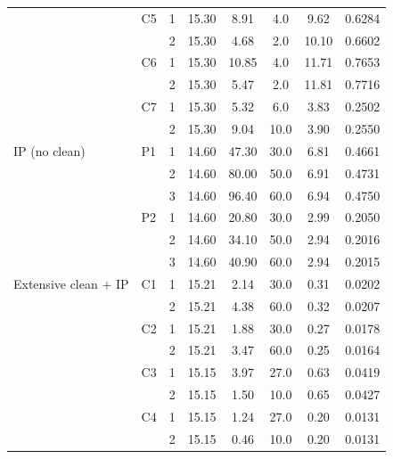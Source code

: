 {\begin{longtable}{llcccccc}
    \addlinespace[2pt]
     & C5 & 1 & 15.30 & 8.91 & 4.0 & 9.62 & 0.6284 \\
     &  & 2 & 15.30 & 4.68 & 2.0 & 10.10 & 0.6602 \\
    \addlinespace[2pt]
     & C6 & 1 & 15.30 & 10.85 & 4.0 & 11.71 & 0.7653 \\
     &  & 2 & 15.30 & 5.47 & 2.0 & 11.81 & 0.7716 \\
    \addlinespace[2pt]
     & C7 & 1 & 15.30 & 5.32 & 6.0 & 3.83 & 0.2502 \\
     &  & 2 & 15.30 & 9.04 & 10.0 & 3.90 & 0.2550 \\
    \midrule
    IP (no clean) & P1 & 1 & 14.60 & 47.30 & 30.0 & 6.81 & 0.4661 \\
     &  & 2 & 14.60 & 80.00 & 50.0 & 6.91 & 0.4731 \\
     &  & 3 & 14.60 & 96.40 & 60.0 & 6.94 & 0.4750 \\
    \addlinespace[2pt]
     & P2 & 1 & 14.60 & 20.80 & 30.0 & 2.99 & 0.2050 \\
     &  & 2 & 14.60 & 34.10 & 50.0 & 2.94 & 0.2016 \\
     &  & 3 & 14.60 & 40.90 & 60.0 & 2.94 & 0.2015 \\
    \midrule
    Extensive clean + IP & C1 & 1 & 15.21 & 2.14 & 30.0 & 0.31 & 0.0202 \\
     &  & 2 & 15.21 & 4.38 & 60.0 & 0.32 & 0.0207 \\
    \addlinespace[2pt]
     & C2 & 1 & 15.21 & 1.88 & 30.0 & 0.27 & 0.0178 \\
     &  & 2 & 15.21 & 3.47 & 60.0 & 0.25 & 0.0164 \\
    \addlinespace[2pt]
     & C3 & 1 & 15.15 & 3.97 & 27.0 & 0.63 & 0.0419 \\
     &  & 2 & 15.15 & 1.50 & 10.0 & 0.65 & 0.0427 \\
    \addlinespace[2pt]
     & C4 & 1 & 15.15 & 1.24 & 27.0 & 0.20 & 0.0131 \\
     &  & 2 & 15.15 & 0.46 & 10.0 & 0.20 & 0.0131 \\
  \bottomrule
\end{longtable}}

